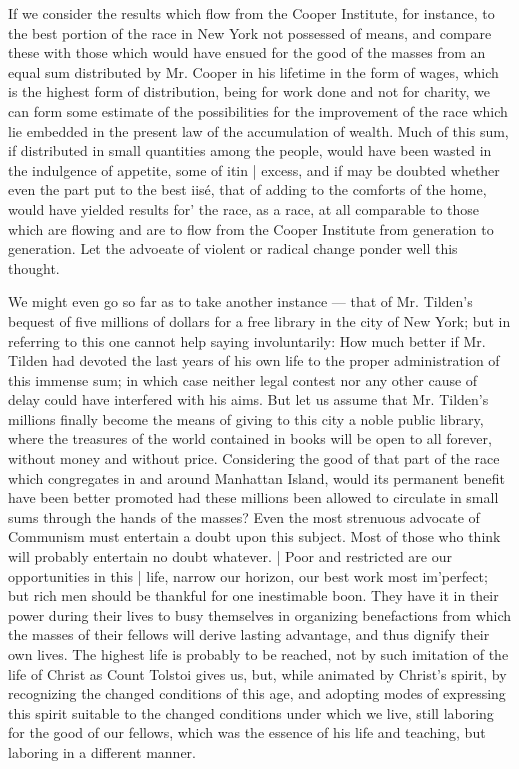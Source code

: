 \documentclass[11pt,openany]{book}
\begin{document}
If we consider the results which flow from the Cooper Institute, for instance, to the best portion of the race in New York not possessed of means, and compare these with those which would have ensued for the good of the masses from an equal sum distributed by Mr. Cooper in his lifetime in the form of wages, which is the highest form of distribution, being for work done and not for charity, we can form some estimate of the possibilities for the improvement of the race which lie embedded in the present law of the accumulation of wealth. Much of this sum, if distributed in small quantities among the people, would have been wasted in the indulgence of appetite, some of itin | excess, and if may be doubted whether even the part put to the best iisé, that of adding to the comforts of the home, would have yielded results for' the race, as a race, at all comparable to those which are flowing and are to flow from the Cooper Institute from generation to generation. Let the advoeate of violent or radical change ponder well this thought.

We might even go so far as to take another instance --- that of Mr. Tilden's bequest of five millions of dollars for a free library in the city of New York; but in referring to this one cannot help saying involuntarily: How much better if Mr. Tilden had devoted the last years of his own life to the proper administration of this immense sum; in which case neither legal contest nor any other cause of delay could have interfered with his aims. But let us assume that Mr. Tilden's millions finally become the means of giving to this city a noble public library, where the treasures of the world contained in books will be open to all forever, without money and without price. Considering the good of that part of the race which congregates in and around Manhattan Island, would its permanent benefit have been better promoted had these millions been allowed to circulate in small sums through the hands of the masses? Even the most strenuous advocate of Communism must entertain a doubt upon this subject. Most of those who think will probably entertain no doubt whatever. | Poor and restricted are our opportunities in this | life, narrow our horizon, our best work most im'perfect; but rich men should be thankful for one inestimable boon. They have it in their power during their lives to busy themselves in organizing benefactions from which the masses of their fellows will derive lasting advantage, and thus dignify their own lives. The highest life is probably to be reached, not by such imitation of the life of Christ as Count Tolstoi gives us, but, while animated by Christ's spirit, by recognizing the changed conditions of this age, and adopting modes of expressing this spirit suitable to the changed conditions under which we live, still laboring for the good of our fellows, which was the essence of his life and teaching, but laboring in a different manner.
\end{document}
